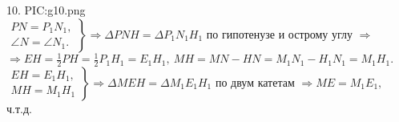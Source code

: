10. {{PIC:g10.png}}\\
$\left.\begin{array}{l}PN=P_1N_1,\\
\angle N=\angle N_1. \end{array}\right\}\Rightarrow
\Delta PNH=\Delta P_1N_1H_1\text{ по гипотенузе и острому углу }\Rightarrow $\\$\Rightarrow EH=\frac{1}{2}PH=\frac{1}{2}P_1H_1=E_1H_1,\ MH=MN-HN=M_1N_1-H_1N_1=M_1H_1.$\\
$\left.\begin{array}{l}EH=E_1H_1,\\
MH=M_1H_1  \end{array}\right\}\Rightarrow \Delta MEH=\Delta M_1E_1H_1\text{ по двум катетам }\Rightarrow ME=M_1E_1,$ ч.т.д.\\
